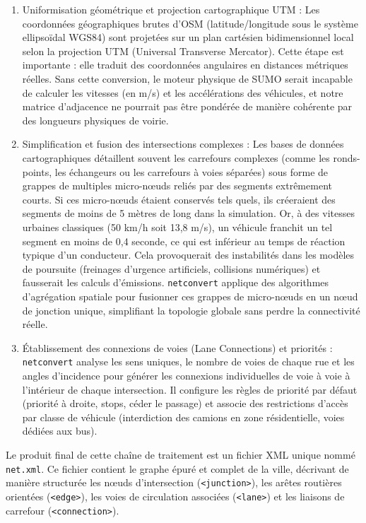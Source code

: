 \documentclass[10pt, a4paper]{article}
\begin{document}
\begin{enumerate}
\def\labelenumi{\arabic{enumi}.}
\item
  Uniformisation géométrique et projection cartographique UTM : Les
  coordonnées géographiques brutes d'OSM (latitude/longitude sous le
  système ellipsoïdal WGS84) sont projetées sur un plan cartésien
  bidimensionnel local selon la projection UTM (Universal Transverse
  Mercator). Cette étape est importante : elle traduit des coordonnées
  angulaires en distances métriques réelles. Sans cette conversion, le
  moteur physique de SUMO serait incapable de calculer les vitesses (en
  m/s) et les accélérations des véhicules, et notre matrice d'adjacence
  ne pourrait pas être pondérée de manière cohérente par des longueurs
  physiques de voirie.
\item
  Simplification et fusion des intersections complexes : Les bases de
  données cartographiques détaillent souvent les carrefours complexes
  (comme les ronds-points, les échangeurs ou les carrefours à voies
  séparées) sous forme de grappes de multiples micro-nœuds reliés par
  des segments extrêmement courts. Si ces micro-nœuds étaient conservés
  tels quels, ils créeraient des segments de moins de 5 mètres de long
  dans la simulation. Or, à des vitesses urbaines classiques (50 km/h
  soit 13,8 m/s), un véhicule franchit un tel segment en moins de 0,4
  seconde, ce qui est inférieur au temps de réaction typique d'un
  conducteur. Cela provoquerait des instabilités dans les modèles de
  poursuite (freinages d'urgence artificiels, collisions numériques) et
  fausserait les calculs d'émissions. \texttt{netconvert} applique des
  algorithmes d'agrégation spatiale pour fusionner ces grappes de
  micro-nœuds en un nœud de jonction unique, simplifiant la topologie
  globale sans perdre la connectivité réelle.
\item
  Établissement des connexions de voies (Lane Connections) et priorités
  : \texttt{netconvert} analyse les sens uniques, le nombre de voies de
  chaque rue et les angles d'incidence pour générer les connexions
  individuelles de voie à voie à l'intérieur de chaque intersection. Il
  configure les règles de priorité par défaut (priorité à droite, stops,
  céder le passage) et associe des restrictions d'accès par classe de
  véhicule (interdiction des camions en zone résidentielle, voies
  dédiées aux bus).
\end{enumerate}

Le produit final de cette chaîne de traitement est un fichier XML unique
nommé \texttt{net.xml}. Ce fichier contient le graphe épuré et complet
de la ville, décrivant de manière structurée les nœuds d'intersection
(\texttt{\textless{}junction\textgreater{}}), les arêtes routières
orientées (\texttt{\textless{}edge\textgreater{}}), les voies de
circulation associées (\texttt{\textless{}lane\textgreater{}}) et les
liaisons de carrefour (\texttt{\textless{}connection\textgreater{}}).
\end{document}
